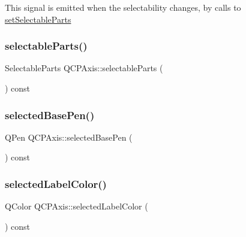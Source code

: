 This signal is emitted when the selectability changes, by calls to \hyperlink{class_q_c_p_axis_a513f9b9e326c505d9bec54880031b085}{set\+Selectable\+Parts} \mbox{\label{class_q_c_p_axis_a1d12d157756c114f4e57517c62177181}} 
\subsubsection{\texorpdfstring{selectable\+Parts()}{selectableParts()}}
{\footnotesize\ttfamily Selectable\+Parts Q\+C\+P\+Axis\+::selectable\+Parts (\begin{DoxyParamCaption}{ }\end{DoxyParamCaption}) const\hspace{0.3cm}{\ttfamily [inline]}}

\mbox{\label{class_q_c_p_axis_a0d54314ab3053fd0fb77294a0e7f08cb}} 
\subsubsection{\texorpdfstring{selected\+Base\+Pen()}{selectedBasePen()}}
{\footnotesize\ttfamily Q\+Pen Q\+C\+P\+Axis\+::selected\+Base\+Pen (\begin{DoxyParamCaption}{ }\end{DoxyParamCaption}) const\hspace{0.3cm}{\ttfamily [inline]}}

\mbox{\label{class_q_c_p_axis_a7adea64ef4b715e7a1c519fff2b110b8}} 
\subsubsection{\texorpdfstring{selected\+Label\+Color()}{selectedLabelColor()}}
{\footnotesize\ttfamily Q\+Color Q\+C\+P\+Axis\+::selected\+Label\+Color (\begin{DoxyParamCaption}{ }\end{DoxyParamCaption}) const\hspace{0.3cm}{\ttfamily [inline]}}

